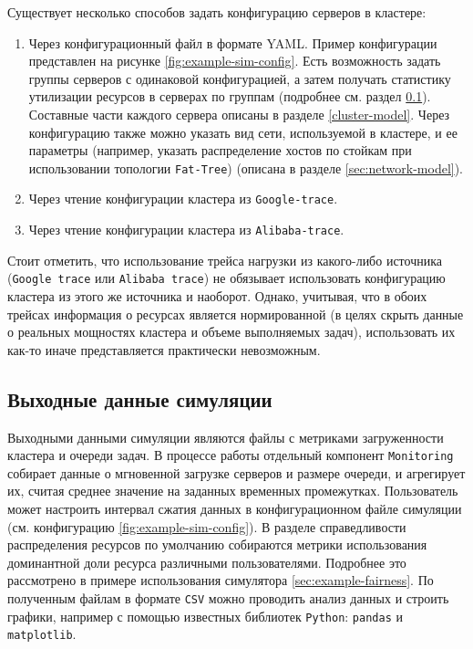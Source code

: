 Существует несколько способов задать конфигурацию серверов в кластере: 
\begin{enumerate}
    \item Через конфигурационный файл в формате YAML. Пример конфигурации представлен на рисунке \ref{fig:example-sim-config}. Есть возможность задать группы серверов с одинаковой конфигурацией, а затем получать статистику утилизации ресурсов в серверах по группам (подробнее см. раздел \ref{sec:output-monitoring}). Составные части каждого сервера описаны в разделе \ref{cluster-model}. Через конфигурацию также можно указать вид сети, используемой в кластере, и ее параметры (например, указать распределение хостов по стойкам при использовании топологии \texttt{Fat-Tree}) (описана в разделе \ref{sec:network-model}).
    \item Через чтение конфигурации кластера из \texttt{Google-trace}.
    \item Через чтение конфигурации кластера из \texttt{Alibaba-trace}.
\end{enumerate}

Стоит отметить, что использование трейса нагрузки из какого-либо источника (\texttt{Google trace} или \texttt{Alibaba trace}) не обязывает использовать конфигурацию кластера из этого же источника и наоборот. Однако, учитывая, что в обоих трейсах информация о ресурсах является нормированной (в целях скрыть данные о реальных мощностях кластера и объеме выполняемых задач), использовать их как-то иначе представляется практически невозможным. 

\subsection{Выходные данные симуляции}\label{sec:output-monitoring}

Выходными данными симуляции являются файлы с метриками загруженности кластера и очереди задач. В процессе работы отдельный компонент \texttt{Monitoring} собирает данные о мгновенной загрузке серверов и размере очереди, и агрегирует их, считая среднее значение на заданных временных промежутках. Пользователь может настроить интервал сжатия данных в конфигурационном файле симуляции (см. конфигурацию \ref{fig:example-sim-config}). В разделе справедливости распределения ресурсов по умолчанию собираются метрики использования доминантной доли ресурса различными пользователями\cite{drf-article}. Подробнее это рассмотрено в примере использования симулятора \ref{sec:example-fairness}. По полученным файлам в формате \texttt{CSV} можно проводить анализ данных и строить графики, например с помощью известных библиотек \texttt{Python}: \texttt{pandas} и \texttt{matplotlib}. 

